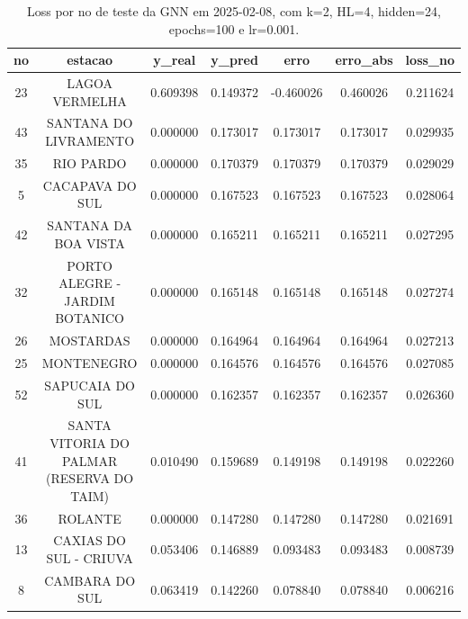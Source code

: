 \begin{table}[h]
\centering
\caption{Loss por no de teste da GNN em 2025-02-08, com k=2, HL=4, hidden=24, epochs=100 e lr=0.001.}
\label{tab:gnn_loss_k2_hl4_h24_e100_d20250208}
\begin{tabular}{ccccccc}
\toprule
no & estacao & y\_real & y\_pred & erro & erro\_abs & loss\_no \\
\midrule
23 & LAGOA VERMELHA & 0.609398 & 0.149372 & -0.460026 & 0.460026 & 0.211624 \\
43 & SANTANA DO LIVRAMENTO & 0.000000 & 0.173017 & 0.173017 & 0.173017 & 0.029935 \\
35 & RIO PARDO & 0.000000 & 0.170379 & 0.170379 & 0.170379 & 0.029029 \\
5 & CACAPAVA DO SUL & 0.000000 & 0.167523 & 0.167523 & 0.167523 & 0.028064 \\
42 & SANTANA DA BOA VISTA & 0.000000 & 0.165211 & 0.165211 & 0.165211 & 0.027295 \\
32 & PORTO ALEGRE - JARDIM BOTANICO & 0.000000 & 0.165148 & 0.165148 & 0.165148 & 0.027274 \\
26 & MOSTARDAS & 0.000000 & 0.164964 & 0.164964 & 0.164964 & 0.027213 \\
25 & MONTENEGRO & 0.000000 & 0.164576 & 0.164576 & 0.164576 & 0.027085 \\
52 & SAPUCAIA DO SUL & 0.000000 & 0.162357 & 0.162357 & 0.162357 & 0.026360 \\
41 & SANTA VITORIA DO PALMAR (RESERVA DO TAIM) & 0.010490 & 0.159689 & 0.149198 & 0.149198 & 0.022260 \\
36 & ROLANTE & 0.000000 & 0.147280 & 0.147280 & 0.147280 & 0.021691 \\
13 & CAXIAS DO SUL - CRIUVA & 0.053406 & 0.146889 & 0.093483 & 0.093483 & 0.008739 \\
8 & CAMBARA DO SUL & 0.063419 & 0.142260 & 0.078840 & 0.078840 & 0.006216 \\
\bottomrule
\end{tabular}
\end{table}
